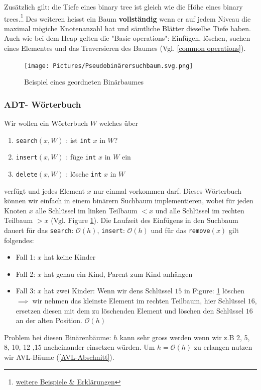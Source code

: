\documentclass[a4paper]{article}
\begin{document}
Zusätzlich gilt: die Tiefe eines binary tree ist gleich wie die Höhe eines binary trees.\footnote{\href{https://www.baeldung.com/cs/binary-tree-height}{weitere Beispiele \& Erklärungen}}
Des weiteren heisst ein Baum \textbf{vollständig} wenn er auf jedem Niveau die maximal mögiche Knotenanzahl hat und sämtliche Blätter dieselbe Tiefe haben. 
Auch wie bei dem Heap gelten die "Basic operations": Einfügen, löschen, suchen eines Elementes und das Traversieren des Baumes (Vgl. \ref{common operations}). 

\begin{figure}[h] 
\caption{Beispiel eines geordneten Binärbaumes}
\centering
\texttt{[image: Pictures/Pseudobinärersuchbaum.svg.png]}
\label{fig: binarytree}
\end{figure}


\subsubsection{ADT- Wörterbuch}
Wir wollen ein Wörterbuch $W$ welches über 
\begin{enumerate}
    \item \texttt{search}$(x,W)$ : ist \texttt{int} $x$ in $W$?
    \item \texttt{insert}$(x,W)$ : füge \texttt{int} $x$ in $W$ ein
    \item \texttt{delete}$(x,W)$ : lösche \texttt{int} $x$ in $W$
\end{enumerate} verfügt und jedes Element $x$ nur einmal vorkommen darf. Dieses Wörterbuch können wir einfach in einem binärern Suchbaum implementieren, wobei für jeden Knoten $x$ alle Schlüssel im linken Teilbaum $< x$ und alle Schlüssel im rechten Teilbaum $> x$ (Vgl. Figure \ref{fig: binarytree}). Die Laufzeit des Einfügens in den Suchbaum dauert für das \texttt{search}: $\mathcal{O}(h)$, \texttt{insert}: $\mathcal{O}(h)$ und für das \texttt{remove}$(x)$ gilt folgendes:
\begin{itemize}
    \item Fall 1: $x$ hat keine Kinder
    \item Fall 2: $x$ hat genau ein Kind, Parent zum Kind anhängen
    \item Fall 3: $x$ hat zwei Kinder: Wenn wir dens Schlüssel $15$ in Figure: \ref{fig: binarytree} löschen $\implies$ wir nehmen das kleinste Element im rechten Teilbaum, hier Schlüssel $16$, ersetzen diesen mit dem zu löschenden Element und löschen den Schlüssel $16$ an der alten Position. $\mathcal{O}(h)$
\end{itemize}
Problem bei diesen Binärenbäume: $h$ kann sehr gross werden wenn wir z.B 2, 5, 8, 10, 12 ,15 nacheinander einsetzen würden. Um $h = \mathcal{O}(h)$ zu erlangen nutzen wir AVL-Bäume (\ref{AVL-Abschnitt}).
\end{document}
